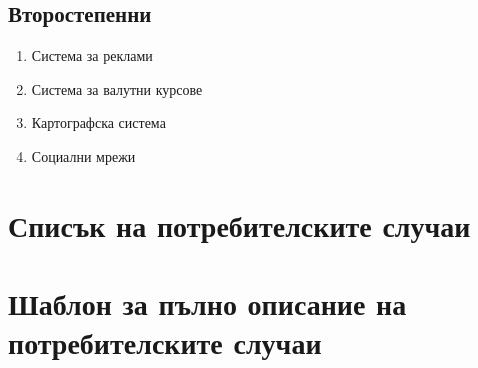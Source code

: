 \documentclass[]{article}
\begin{document}
\subsection{Второстепенни}
\begin{enumerate}
\item Система за реклами
\item Система за валутни курсове
\item Картографска система
\item Социални мрежи
\end{enumerate}


\section*{Списък на потребителските случаи} %



\section*{Шаблон за пълно описание на потребителските случаи}
\end{document}
